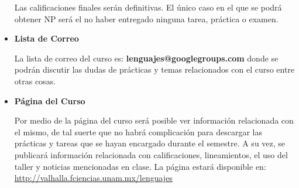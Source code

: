 \documentclass[10pt]{article}
\begin{document}
\begin{itemize}
  Las calificaciones finales serán definitivas. El único caso en el que se podrá obtener NP será el no haber entregado ninguna tarea, práctica o examen.
  
  \item \textbf{Lista de Correo}

  La lista de correo del curso es: \textbf{lenguajes@googlegroups.com} donde se
  podrán discutir las dudas de prácticas y temas relacionados
  con el curso entre otras cosas.

\item \textbf{Página del Curso}

  Por medio de la página del curso será posible ver información relacionada
  con el mismo, de tal suerte que no habrá complicación para descargar las
  prácticas y tareas que se hayan encargado durante el semestre. A su
  vez, se publicará información relacionada con calificaciones,
  lineamientos, el uso del taller y noticias mencionadas en
  clase. La página estará disponible en: \\
  \url{http://valhalla.fciencias.unam.mx/lenguajes} 

\end{itemize}
\end{document}
